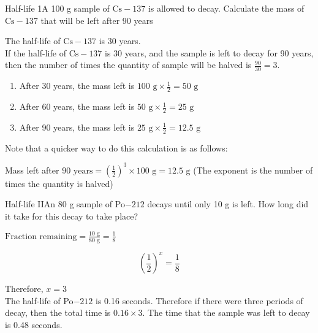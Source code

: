 \begin{wex}{Half-life 1}{A 100 g sample of $\text{Cs}-137$ is allowed to decay. Calculate the mass of $\text{Cs}-137$ that will be left after 90 years\vspace{-.5cm}}{
The half-life of $\text{Cs}-137$ is 30 years.\\
If the half-life of $\text{Cs}-137$ is 30 years, and the sample is left to decay for 90 years, then the number of times the quantity of sample will be halved is $\frac{90}{30} = 3$.\\
\begin{enumerate}
 \item After 30 years, the mass left is $100 \text{ g} \times \frac{1}{2} = 50 \text{ g}$
\item After 60 years, the mass left is $50 \text{ g} \times \frac{1}{2} = 25 \text{ g}$
\item After 90 years, the mass left is $25 \text{ g} \times \frac{1}{2} = 12.5 \text{ g}$ 
\end{enumerate}

Note that a quicker way to do this calculation is as follows:

Mass left after $90 \text{ years} = (\frac{1}{2})^{3} \times 100 \text{ g} = 12.5 \text{ g}$ (The exponent is the number of times the quantity is halved)
}
\end{wex}

\begin{wex}{Half-life II}{An 80 g sample of Po$-212$ decays until only 10 g is left. How long did it take for this decay to take place?}
{
$\text{Fraction remaining} = \frac{10 \text{ g}}{80 \text{ g}} = \frac{1}{8}$\\

\begin{equation*}
(\frac{1}{2})^{x} = \frac{1}{8}
\end{equation*}

Therefore, $x = 3$\\
The half-life of Po$-212$ is 0.16 seconds. Therefore if there were three periods of decay, then the total time is $0.16 \times 3$. The time that the sample was left to decay is 0.48 seconds.
}
\end{wex}

